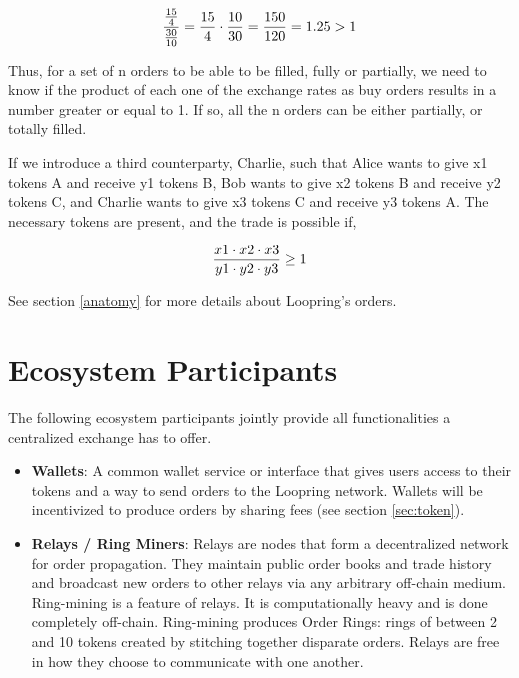 \documentclass[UTF8,nofonts]{article}
\begin{document}
\begin{multicols}{2}
\begin{equation}
{{15\over 4} \over {30\over 10}} = {15 \over 4} \cdot {10 \over 30} = {150 \over 120} = 1.25 > 1
\end{equation}

Thus, for a set of n orders to be able to be filled, fully or partially, we need to know if the product of each one of the exchange rates as buy orders results in a number greater or equal to 1. If so, all the n orders can be either partially, or totally filled.

If we introduce a third counterparty, Charlie, such that  Alice wants to give x1 tokens A and receive y1 tokens B, Bob wants to give x2 tokens B and receive y2 tokens C, and Charlie wants to give x3 tokens C and receive y3 tokens A. The necessary tokens are present, and the trade is possible if,

\begin{equation}
{{x1 \cdot x2 \cdot x3 \over y1 \cdot y2 \cdot y3} \geq 1}
\end{equation}


See section \ref{anatomy} for more details about Loopring's orders.


\section{Ecosystem Participants\label{sec:ecosystem}}
The following ecosystem participants jointly provide all functionalities a centralized exchange has to offer. 

\begin{itemize}

\item \textbf{Wallets}: A common wallet service or interface that gives users access to their tokens and a way to send orders to the Loopring network. Wallets will be incentivized to produce orders by sharing fees (see section \ref{sec:token}).

\item \textbf{Relays / Ring Miners}: Relays are nodes that form a decentralized network for order propagation. They maintain public order books and trade history and broadcast new orders to other relays via any arbitrary off-chain medium. Ring-mining is a feature of relays. It is computationally heavy and is done completely off-chain. Ring-mining produces Order Rings: rings of between 2 and 10 tokens created by stitching together disparate orders. Relays are free in how they choose to communicate with one another. 


\end{itemize}
\end{multicols}
\end{document}
